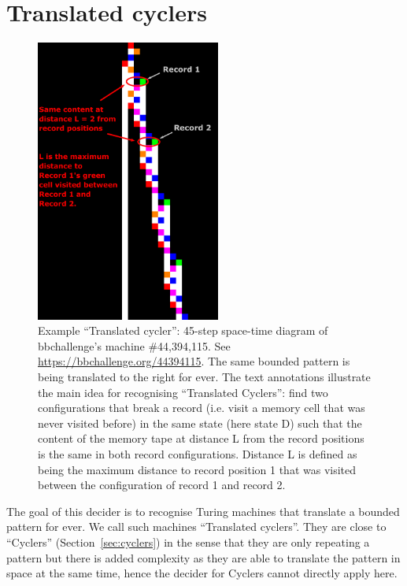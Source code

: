 
\newpage
\section{Translated cyclers}\label{sec:translated-cyclers}

\begin{figure}[h!]
  \centering
  \includegraphics[width=0.54\textwidth]{figures/space-time-diagrams/translated_cycler_44394115_annotated.pdf}

  \caption{Example ``Translated cycler'': 45-step space-time diagram of bbchallenge's machine \#44,394,115. See \url{https://bbchallenge.org/44394115}. The same bounded pattern is being translated to the right for ever. The text annotations illustrate the main idea for recognising ``Translated Cyclers'': find two configurations that break a record (i.e. visit a memory cell that was never visited before) in the same state (here state \textcolor{colorD}{D}) such that the content of the memory tape at distance L from the record positions is the same in both record configurations. Distance L is defined as being the maximum distance to record position 1 that was visited between the configuration of record 1 and record 2.}\label{fig:translated-cyclers}
\end{figure}

The goal of this decider is to recognise Turing machines that translate a bounded pattern for ever. We call such machines ``Translated cyclers''. They are close to ``Cyclers'' (Section~\ref{sec:cyclers}) in the sense that they are only repeating a pattern but there is added complexity as they are able to translate the pattern in space at the same time, hence the decider for Cyclers cannot directly apply here.

